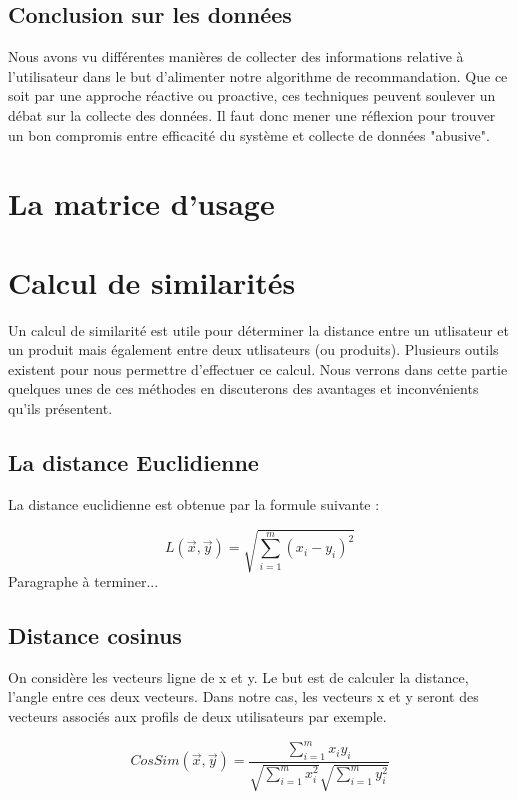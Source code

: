 \documentclass{report}
\begin{document}
\subsection{Conclusion sur les données}
Nous avons vu différentes manières de collecter des informations relative à l'utilisateur dans le but d'alimenter notre algorithme de recommandation. Que ce soit par une approche réactive ou proactive, ces techniques peuvent soulever un débat sur la collecte des données. Il faut donc mener une réflexion pour trouver un bon compromis entre efficacité du système et collecte de données "abusive".

\section{La matrice d'usage}

\section{Calcul de similarités}
Un calcul de similarité est utile pour déterminer la distance entre un utlisateur et un produit mais également entre deux utlisateurs (ou produits).
Plusieurs outils existent pour nous permettre d'effectuer ce calcul.
Nous verrons dans cette partie quelques unes de ces méthodes en discuterons des avantages et inconvénients qu'ils présentent.

\subsection{La distance Euclidienne}
La distance euclidienne est obtenue par la formule suivante :

\begin{equation}
    L(\vec{x}, \vec{y}) = \sqrt{\sum_{i=1}^m (x_i - y_i)^2}
\end{equation}
Paragraphe à terminer...

\subsection{Distance cosinus}
On considère les vecteurs ligne de x et y. Le but est de calculer la distance, l’angle entre ces deux vecteurs. Dans notre cas, les vecteurs x et y seront des vecteurs associés aux profils de deux utilisateurs par exemple.

\begin{equation}
    CosSim(\vec{x}, \vec{y}) = \frac{\sum_{i=1}^m x_i y_i}{\sqrt{\sum_{i=1}^m x_i ^2}\sqrt{\sum_{i=1}^m y_i ^2}}
\end{equation}
\end{document}
